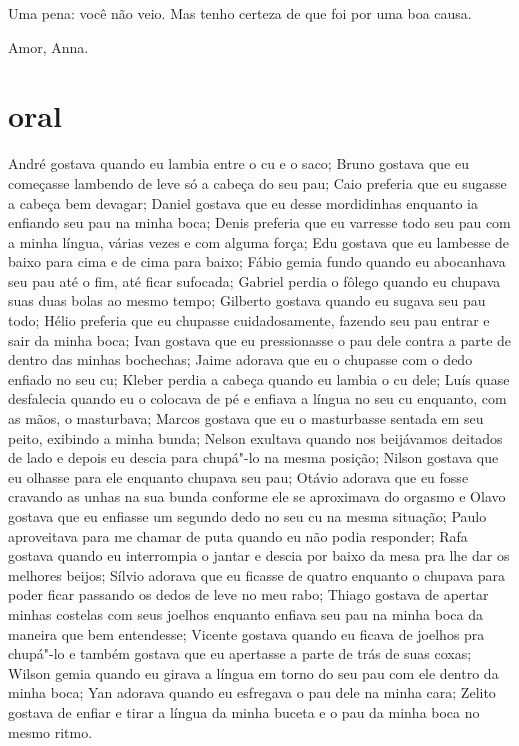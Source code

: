 Uma pena: você não veio. Mas tenho certeza de que foi por uma boa causa.


 \begin{flushright}Amor, Anna.\end{flushright}


\chapter{ oral }

André gostava quando eu lambia entre o cu e o saco; Bruno gostava que eu
começasse lambendo de leve só a cabeça do seu pau; Caio preferia que eu
sugasse a cabeça bem devagar; Daniel gostava que eu desse mordidinhas
enquanto ia enfiando seu pau na minha boca; Denis preferia que eu
varresse todo seu pau com a minha língua, várias vezes e com alguma
força; Edu gostava que eu lambesse de baixo para cima e de cima para
baixo; Fábio gemia fundo quando eu abocanhava seu pau até o fim, até
ficar sufocada; Gabriel perdia o fôlego quando eu chupava suas duas
bolas ao mesmo tempo; Gilberto gostava quando eu sugava seu pau todo;
Hélio preferia que eu chupasse cuidadosamente, fazendo seu pau entrar e
sair da minha boca; Ivan gostava que eu pressionasse o pau dele contra a
parte de dentro das minhas bochechas; Jaime adorava que eu o chupasse
com o dedo enfiado no seu cu; Kleber perdia a cabeça quando eu lambia o
cu dele; Luís quase desfalecia quando eu o colocava de pé e enfiava a
língua no seu cu enquanto, com as mãos, o masturbava; Marcos gostava que
eu o masturbasse sentada em seu peito, exibindo a minha bunda; Nelson
exultava quando nos beijávamos deitados de lado e depois eu descia para
chupá"-lo na mesma posição; Nilson gostava que eu olhasse para ele
enquanto chupava seu pau; Otávio adorava que eu fosse cravando as unhas
na sua bunda conforme ele se aproximava do orgasmo e Olavo gostava que
eu enfiasse um segundo dedo no seu cu na mesma situação; Paulo
aproveitava para me chamar de puta quando eu não podia responder; Rafa
gostava quando eu interrompia o jantar e descia por baixo da mesa pra
lhe dar os melhores beijos; Sílvio adorava que eu ficasse de quatro
enquanto o chupava para poder ficar passando os dedos de leve no meu
rabo; Thiago gostava de apertar minhas costelas com seus joelhos
enquanto enfiava seu pau na minha boca da maneira que bem entendesse;
Vicente gostava quando eu ficava de joelhos pra chupá"-lo e também
gostava que eu apertasse a parte de trás de suas coxas; Wilson gemia
quando eu girava a língua em torno do seu pau com ele dentro da minha
boca; Yan adorava quando eu esfregava o pau dele na minha cara; Zelito
gostava de enfiar e tirar a língua da minha buceta e o pau da minha boca
no mesmo ritmo.

